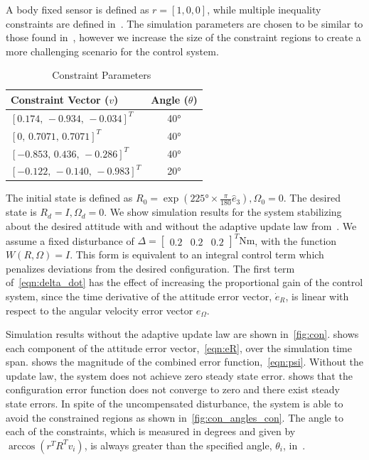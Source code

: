 \documentclass[10pt,fleqn]{IJCAS}  %
\begin{document}
\begin{multicols}{2}
A body fixed sensor is defined as \(r = [1,0,0]\), while multiple inequality constraints are defined in~.
The simulation parameters are chosen to be similar to those found in~\cite{lee2011b}, however we increase the size of the constraint regions to create a more challenging scenario for the control system.
\begin{table}[H]
\caption{Constraint Parameters~\label{tab:constraints}}
\begin{center}\begin{tabular}{lc}
Constraint Vector (\( v \)) & Angle (\( \theta \)) \\ \hline \hline 
\([0.174,\,-0.934,\, -0.034]^T\) & \ang{40} \\ \hline 
\([0 ,\, 0.7071 ,\, 0.7071]^T\) & \ang{40} \\ \hline 
\([-0.853 ,\, 0.436 ,\, -0.286]^T\) & \ang{40} \\ \hline 
\([-0.122 ,\,-0.140,\, -0.983]^T\) & \ang{20}\end{tabular} 
\end{center}
\end{table}

The initial state is defined as \(R_0 =  \exp(\ang{225} \times \frac{\pi}{180} \hat{e}_3), \Omega_0 = 0\). 
The desired state is \( R_d = I,\Omega_d = 0\).
We show simulation results for the system stabilizing about the desired attitude with and without the adaptive update law from~.
We assume a fixed disturbance of \(\Delta = \begin{bmatrix} 0.2 & 0.2 & 0.2 \end{bmatrix}^T \si{\newton\meter}\), with the function \( W(R,\Omega) = I \).
This form is equivalent to an integral control term which penalizes deviations from the desired configuration.
The first term of~\cref{eqn:delta_dot} has the effect of increasing the proportional gain of the control system, since the time derivative of the attitude error vector, \( \dot{e}_{R} \), is linear with respect to the angular velocity error vector \( e_\Omega\).

Simulation results without the adaptive update law are shown in~\cref{fig:con}.
 shows each component of the attitude error vector,~\cref{eqn:eR}, over the simulation time span.
 shows the  magnitude of the combined error function,~\cref{eqn:psi}.
Without the update law, the system does not achieve zero steady state error. 
 shows that the configuration error function does not converge to zero and there exist steady state errors.
In spite of the uncompensated disturbance, the system is able to avoid the constrained regions as shown in~\cref{fig:con_angles_con}.
The angle to each of the constraints, which is measured in degrees and given by \( \arccos(r^T R^T v_i) \), is always greater than the specified angle, \( \theta_i \), in~.


\end{multicols}
\end{document}
